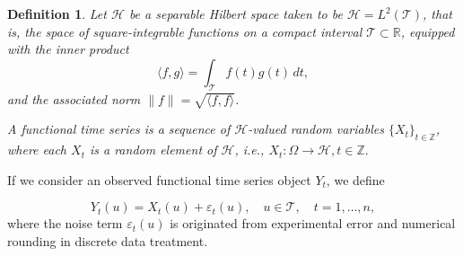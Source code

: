 \documentclass[
	12pt,				%
	oneside,			%
	a4paper,			%
	english,			%
	brazil				%
	]{abntex2ppgsi}
\newtheorem{definition}{Definition}
\begin{document}
\begin{definition}
Let $\mathcal{H}$ be a separable Hilbert space taken to be $\mathcal{H} = L^2(\mathcal{T})$, that is, the space of square-integrable functions on a compact interval $\mathcal{T} \subset \mathbb{R}$, equipped with the inner product
\begin{equation}
\langle f, g \rangle = \int_{\mathcal{T}} f(t) g(t) \, dt,
\end{equation}
and the associated norm $\|f\| = \sqrt{\langle f, f \rangle}$.

A \emph{functional time series} is a sequence of $\mathcal{H}$-valued random variables $\{X_t\}_{t \in \mathbb{Z}}$, where each $X_t$ is a random element of $\mathcal{H}$, i.e., $X_t : \Omega \to \mathcal{H}, t \in \mathbb{Z}.$

\end{definition}

If we consider an observed functional time series object $Y_t$, we define

\begin{equation}
     Y_t(u) = X_t(u) + \varepsilon_t(u), \quad u \in \mathcal{T}, \quad t = 1, \dots, n,
\end{equation}
where the noise term $\varepsilon_t(u)$ is originated from experimental error and numerical rounding in discrete data treatment.
\end{document}
